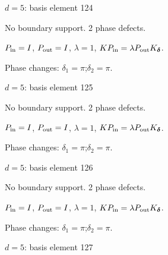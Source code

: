 \vfill
{\footnotesize\texttt{}}
\newpage
{}
{\Large $d=5$: basis element 124}\par
No boundary support. 2 phase defects.
\begin{center}
\end{center}
\vspace{-1mm}
$P_{\rm in}=I$, \quad $P_{\rm out}=I$, \quad $\lambda=1$, \qquad $K P_{\rm in}=\lambda P_{\rm out}K_{\boldsymbol\delta}$.
\par\smallskip\begin{minipage}{.98\linewidth}\small Phase changes: $\delta_{1}=\pi$;\quad $\delta_{2}=\pi$.\end{minipage}
\vfill
{\footnotesize\texttt{}}
\newpage
{}
{\Large $d=5$: basis element 125}\par
No boundary support. 2 phase defects.
\begin{center}
\end{center}
\vspace{-1mm}
$P_{\rm in}=I$, \quad $P_{\rm out}=I$, \quad $\lambda=1$, \qquad $K P_{\rm in}=\lambda P_{\rm out}K_{\boldsymbol\delta}$.
\par\smallskip\begin{minipage}{.98\linewidth}\small Phase changes: $\delta_{1}=\pi$;\quad $\delta_{2}=\pi$.\end{minipage}
\vfill
{\footnotesize\texttt{}}
\newpage
{}
{\Large $d=5$: basis element 126}\par
No boundary support. 2 phase defects.
\begin{center}
\end{center}
\vspace{-1mm}
$P_{\rm in}=I$, \quad $P_{\rm out}=I$, \quad $\lambda=1$, \qquad $K P_{\rm in}=\lambda P_{\rm out}K_{\boldsymbol\delta}$.
\par\smallskip\begin{minipage}{.98\linewidth}\small Phase changes: $\delta_{1}=\pi$;\quad $\delta_{2}=\pi$.\end{minipage}
\vfill
{\footnotesize\texttt{}}
\newpage
{}
{\Large $d=5$: basis element 127}\par
